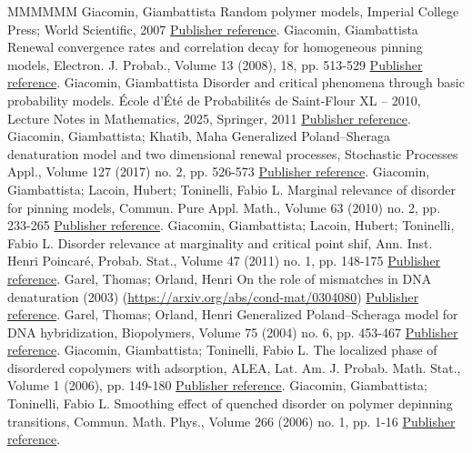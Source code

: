 \documentclass[11pt]{article}
\theoremstyle{definition}
\numberwithin{equation}{section}
\numberwithin{figure}{section}
\numberwithin{table}{section}
\begin{document}
\begin{thebibliography}{MMMMMM}
 Giacomin, Giambattista Random polymer models, Imperial College Press; World Scientific, 2007 \href{https://ahl.centre-mersenne.org/item/AHL_2020__3__299_0/#cf:GB}{Publisher reference}.
 Giacomin, Giambattista Renewal convergence rates and correlation decay for homogeneous pinning models, Electron. J. Probab., Volume 13 (2008), 18, pp. 513-529 \href{https://ahl.centre-mersenne.org/item/AHL_2020__3__299_0/#cf:G08}{Publisher reference}.
 Giacomin, Giambattista Disorder and critical phenomena through basic probability models. École d’Été de Probabilités de Saint-Flour XL – 2010, Lecture Notes in Mathematics, 2025, Springer, 2011 \href{https://ahl.centre-mersenne.org/item/AHL_2020__3__299_0/#cf:G}{Publisher reference}.
 Giacomin, Giambattista; Khatib, Maha Generalized Poland–Sheraga denaturation model and two dimensional renewal processes, Stochastic Processes Appl., Volume 127 (2017) no. 2, pp. 526-573 \href{https://ahl.centre-mersenne.org/item/AHL_2020__3__299_0/#cf:GK}{Publisher reference}.
 Giacomin, Giambattista; Lacoin, Hubert; Toninelli, Fabio L. Marginal relevance of disorder for pinning models, Commun. Pure Appl. Math., Volume 63 (2010) no. 2, pp. 233-265 \href{https://ahl.centre-mersenne.org/item/AHL_2020__3__299_0/#cf:1GLT10}{Publisher reference}.
 Giacomin, Giambattista; Lacoin, Hubert; Toninelli, Fabio L. Disorder relevance at marginality and critical point shif, Ann. Inst. Henri Poincaré, Probab. Stat., Volume 47 (2011) no. 1, pp. 148-175 \href{https://ahl.centre-mersenne.org/item/AHL_2020__3__299_0/#cf:GLT11}{Publisher reference}.
 Garel, Thomas; Orland, Henri On the role of mismatches in DNA denaturation (2003) (\url{https://arxiv.org/abs/cond-mat/0304080}) \href{https://ahl.centre-mersenne.org/item/AHL_2020__3__299_0/#cf:GOO}{Publisher reference}.
 Garel, Thomas; Orland, Henri Generalized Poland–Scheraga model for DNA hybridization, Biopolymers, Volume 75 (2004) no. 6, pp. 453-467 \href{https://ahl.centre-mersenne.org/item/AHL_2020__3__299_0/#cf:GO04}{Publisher reference}.
 Giacomin, Giambattista; Toninelli, Fabio L. The localized phase of disordered copolymers with adsorption, ALEA, Lat. Am. J. Probab. Math. Stat., Volume 1 (2006), pp. 149-180 \href{https://ahl.centre-mersenne.org/item/AHL_2020__3__299_0/#cf:GTalea}{Publisher reference}.
 Giacomin, Giambattista; Toninelli, Fabio L. Smoothing effect of quenched disorder on polymer depinning transitions, Commun. Math. Phys., Volume 266 (2006) no. 1, pp. 1-16 \href{https://ahl.centre-mersenne.org/item/AHL_2020__3__299_0/#cf:GT06}{Publisher reference}.

\end{thebibliography}
\end{document}

